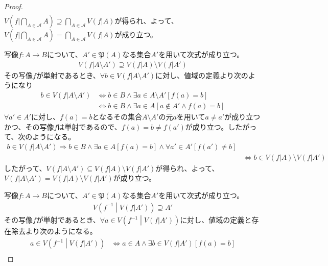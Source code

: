 \documentclass[dvipdfmx]{jsarticle}
\begin{document}
\begin{proof}
\begin{align*}
\end{align*}
$V\left( f|\bigcap_{A \in \mathcal{A}} A \right) \supseteq \bigcap_{A \in \mathcal{A}} {V\left( f|A \right)}$が得られ、よって、$V\left( f|\bigcap_{A \in \mathcal{A}} A \right) = \bigcap_{A \in \mathcal{A}} {V\left( f|A \right)}$が成り立つ。\par
写像$f:A \rightarrow B$について、$A'\in \mathfrak{P}(A)$なる集合$A'$を用いて次式が成り立つ。
\begin{align*}
V\left( f|A \setminus A' \right) \supseteq V\left( f|A \right) \setminus V\left( f|A' \right)
\end{align*}
その写像$f$が単射であるとき、$\forall b \in V\left( f|A \setminus A' \right)$に対し、値域の定義より次のようになり
\begin{align*}
b \in V\left( f|A \setminus A' \right) &\Leftrightarrow b \in B \land \exists a \in A \setminus A'\left[ f(a) = b \right]\\
&\Leftrightarrow b \in B \land \exists a \in A\left[ a \notin A' \land f(a) = b \right]
\end{align*}
$\forall a' \in A'$に対し、$f(a) = b$となるその集合$A \setminus A'$の元$a$を用いて$a \neq a'$が成り立つかつ、その写像$f$は単射であるので、$f(a) = b \neq f\left( a' \right)$が成り立つ。したがって、次のようになる。
\begin{align*}
b \in V\left( f|A \setminus A' \right) \Rightarrow b \in B \land \exists a \in A\left[ f(a) = b \right] \land \forall a' \in A'\left[ f\left( a' \right) \neq b \right]\\
&\Leftrightarrow b \in V\left( f|A \right) \setminus V\left( f|A' \right)
\end{align*}
したがって、$V\left( f|A \setminus A' \right) \subseteq V\left( f|A \right) \setminus V\left( f|A' \right)$が得られ、よって、$V\left( f|A \setminus A' \right) = V\left( f|A \right) \setminus V\left( f|A' \right)$が成り立つ。\par
写像$f:A \rightarrow B$について、$A'\in \mathfrak{P}(A)$なる集合$A'$を用いて次式が成り立つ。
\begin{align*}
V\left( f^{- 1} \middle| V\left( f|A' \right) \right) \supseteq A'
\end{align*}
その写像$f$が単射であるとき、$\forall a \in V\left( f^{- 1} \middle| V\left( f|A' \right) \right)$に対し、値域の定義と存在除去より次のようになる。
\begin{align*}
a \in V\left( f^{- 1} \middle| V\left( f|A' \right) \right) &\Leftrightarrow a \in A \land \exists b \in V\left( f|A' \right)\left[ f(a) = b \right]\\

\end{align*}
\end{proof}
\end{document}
